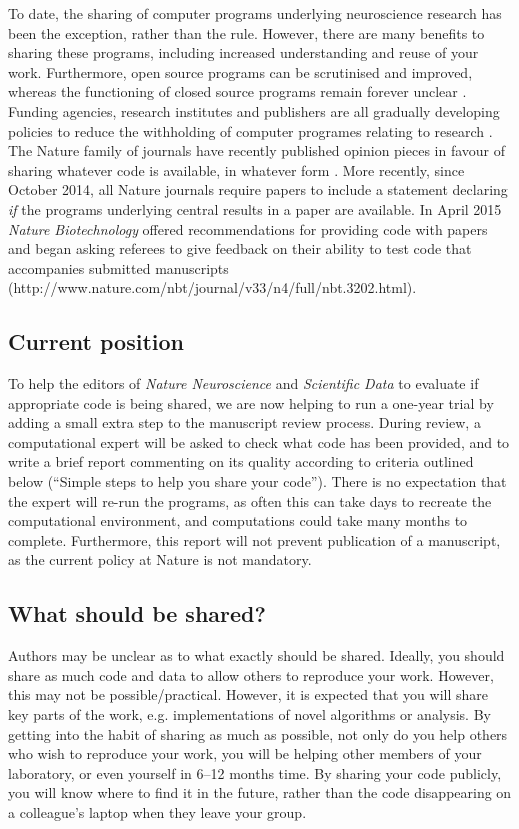 \documentclass[11pt]{article}
\begin{document}
To date, the sharing of computer programs underlying neuroscience
research has been the exception, rather than the rule.  However, there
are many benefits to sharing these programs, including increased
understanding and reuse of your work.  Furthermore, open source programs can be scrutinised and improved, whereas the functioning of closed source
programs remain forever unclear \cite{Vihinen2015}.  Funding agencies, research institutes and publishers are all gradually developing policies to
reduce the withholding of computer programes relating to research
\cite{Morin2012-65e}.  The Nature family of journals have recently
published opinion pieces in favour of sharing whatever code is
available, in whatever form \cite{Barnes2010-iv,Ince2012-225}.  More
recently, since October 2014, all Nature journals require papers to
include a statement declaring \textit{if} the programs underlying central
results in a paper are available. In April 2015 \textit{Nature Biotechnology} offered recommendations for providing code with papers and began asking referees to give feedback on their ability to test code that 
accompanies submitted manuscripts (http://www.nature.com/nbt/journal/v33/n4/full/nbt.3202.html).

\subsection*{Current position}

To help the editors of \textit{Nature Neuroscience} and
\textit{Scientific Data} to evaluate if appropriate code is being
shared, we are now helping to run a one-year trial by adding a small
extra step to the manuscript review process.  During review, a
computational expert will be asked to check what code has been
provided, and to write a brief report commenting on its quality
according to criteria outlined below (``Simple steps to help you share
your code'').  There is no expectation that the expert will re-run the
programs, as often this can take days to recreate the computational
environment, and computations could take many months to complete.
Furthermore, this report will not prevent publication of a manuscript, as the current policy at Nature is not mandatory.


\subsection*{What should be shared?}

Authors may be unclear as to what exactly should be shared.  Ideally,
you should share as much code and data to allow others to reproduce
your work.  However, this may not be possible/practical.  However, it
is expected that you will share key parts of the work, e.g. implementations of novel algorithms or analysis.  By getting into the habit of sharing as much as possible, not only do you help others who wish to reproduce your work, you will be helping other members of your laboratory, or even yourself in 6--12 months time.  By sharing your code publicly, you will know where to find it in the future, rather than the code disappearing on a colleague's laptop when they leave your group.
\end{document}
